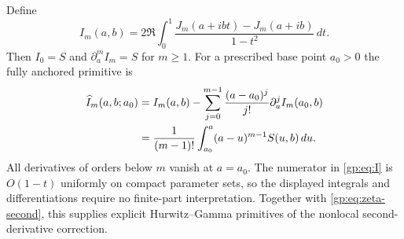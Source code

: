 Define
\begin{equation}\label{gp:eq:I}
 I_m(a,b)=2\Re\int_0^1
                 \frac{J_m(a+ibt)-J_m(a+ib)}{1-t^2}\,dt.
\end{equation}
Then $I_0=S$ and $\partial_a^m I_m=S$ for $m\ge1$.
For a prescribed base point $a_0>0$ the fully anchored primitive is
\begin{align}
 \widehat I_m(a,b;a_0)
 &=I_m(a,b)-\sum_{j=0}^{m-1}
       \frac{(a-a_0)^j}{j!}\partial_a^j I_m(a_0,b)
       \label{gp:eq:anchored}\\
 &=\frac1{(m-1)!}\int_{a_0}^{a}(a-u)^{m-1}S(u,b)\,du.
       \notag
\end{align}
All derivatives of orders below $m$ vanish at $a=a_0$.  The numerator
in \eqref{gp:eq:I} is $O(1-t)$ uniformly on compact parameter sets,
so the displayed integrals and differentiations require no finite-part
interpretation.  Together with \eqref{gp:eq:zeta-second}, this supplies
explicit Hurwitz--Gamma primitives of the nonlocal second-derivative
correction.

